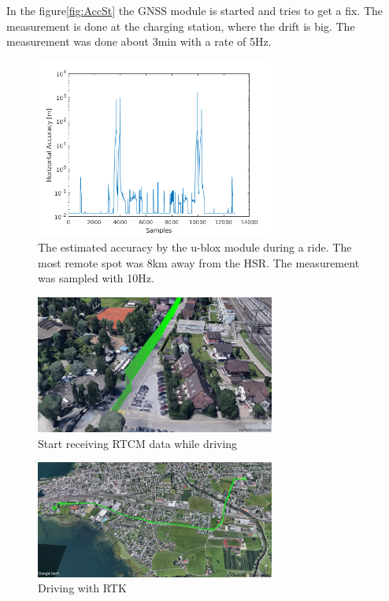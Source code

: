 In the figure\ref{fig:AccSt} the GNSS module is started and tries to get a fix. The measurement is done at the charging station, where the drift is big. The measurement was done about 3\;min with a rate of 5\;Hz.

\begin{figure}[htb]
	\centering
	\includegraphics[width=0.7\textwidth]{images/RTKAccDrv}
	\caption{The estimated accuracy by the u-blox module during a ride. The most remote spot was 8\;km away from the HSR. The measurement was sampled with 10\;Hz.}
	\label{fig:rtkhf}
\end{figure}

\begin{figure}[htb]
	\centering
	\includegraphics[width=0.7\textwidth]{images/RTK_Messfahrt_fix}
	\caption{Start receiving RTCM data while driving}
	\label{fig:RTKMFfix}
\end{figure}

\begin{figure}[htb]
	\centering
	\includegraphics[width=0.7\textwidth]{images/RTK_Messfahrt}
	\caption{Driving with RTK}
	\label{fig:RTKMF}
\end{figure}

\clearpage
\pagebreak
